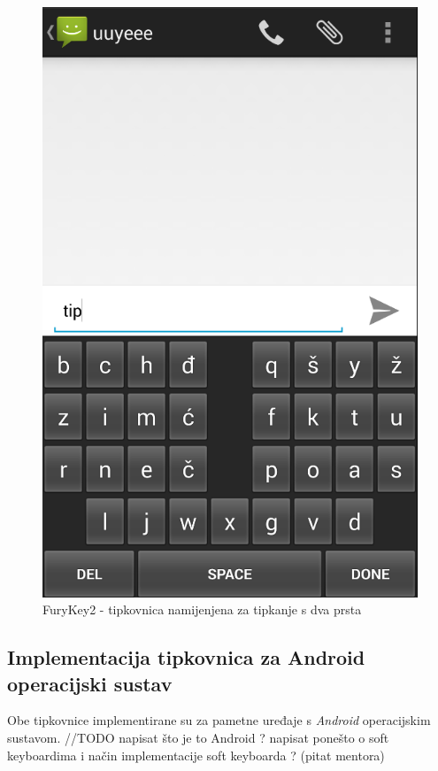 \documentclass[times, utf8, zavrsni]{fer}
\begin{document}
\begin{figure}[htb]
\begin{minipage}[b]{0.48\textwidth}
    \includegraphics[width=\textwidth]{img/FuryKey2.PNG}
    \caption{FuryKey2 - tipkovnica namijenjena za tipkanje s dva prsta}
    \label{fig:FuryKey2}
  \end{minipage}
\end{figure}

\subsection{Implementacija tipkovnica za Android operacijski sustav}
Obe tipkovnice implementirane su za pametne uređaje s \emph{Android} operacijskim sustavom. //TODO napisat što je to Android ? napisat ponešto o soft keyboardima i način implementacije soft keyboarda ? (pitat mentora)
\end{document}

